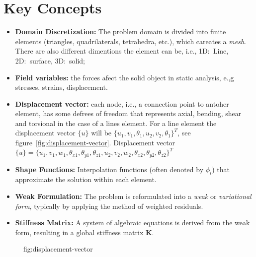 \section{Key Concepts}
\begin{itemize}
    \item \textbf{Domain Discretization:} The problem domain is divided into finite elements (triangles, quadrilaterals, tetrahedra, etc.), which careates a \textit{mesh}. There are also different dimentions the element can be, i.e., 1D:\ Line, 2D:\ surface, 3D:\ solid;
    \item \textbf{Field variables:} the forces afect the solid object in static analysis, e.,g stresses, strains, displacement.
    \item \textbf{Displacement vector:} each node, i.e., a connection point to antoher element, has some defrees of freedom that represents axial, bending, shear and torsional in the case of a lines element. For a line element the displacement vector $\{u\}$ will be $\{u_1, v_1, \theta_1, u_2, v_2, \theta_1\} ^T$, see figure~\ref{fig:displacement-vector}. Displacement vector $\{u\} = \{ u_1, v_1, w_1, \theta_{x1}, \theta_{y1}, \theta_{z1}, u_2, v_2, w_2, \theta_{x2}, \theta_{y2}, \theta_{z2}\} ^T$
    \item \textbf{Shape Functions:} Interpolation functions (often denoted by $\phi_i$) that approximate the solution within each element.
    \item \textbf{Weak Formulation:} The problem is reformulated into a \textit{weak} or \textit{variational form}, typically by applying the method of weighted residuals.
    \item \textbf{Stiffness Matrix:} A system of algebraic equations is derived from the weak form, resulting in a global stiffness matrix $\mathbf{K}$.
\end{itemize}

\begin{figure}[H]
  \centering
  \caption{fig:displacement-vector}
\end{figure}

